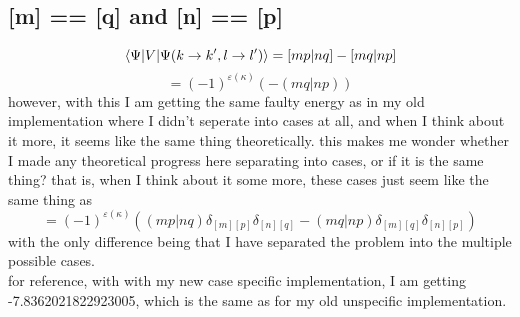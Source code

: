 \documentclass[12pt]{article}
\begin{document}
\subsection{[m] == [q] and [n] == [p]}
\begin{equation}
    \mel{\Psi }{V}{\Psi (k\rightarrow k^{\prime}, l\rightarrow l^{\prime})}
    =[mp|nq]-[mq|np]
\end{equation}
\begin{equation}
=(-1)^{\varepsilon (\kappa )}(-(mq|np))
\end{equation}
however, with this I am getting the same faulty energy as in my old implementation where I didn't seperate into cases at all, and when I think about it more, it seems like the same thing theoretically. this makes me wonder whether I made any theoretical progress here separating into cases, or if it is the same thing? that is, when I think about it some more, these cases just seem like the same thing as
\begin{equation}
    =(-1)^{\varepsilon (\kappa )}((mp|nq)\delta _{[m][p]}\delta _{[n][q]}-(mq|np)\delta _{[m][q]}\delta _{[n][p]})
\end{equation}
with the only difference being that I have separated the problem into the multiple possible cases.
\\for reference, with with my new case specific implementation, I am getting -7.8362021822923005, which is the same as for my old unspecific implementation.
 
\end{document}
